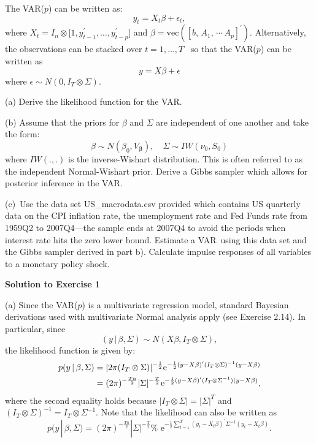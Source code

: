 \documentclass{article}
\begin{document}
The VAR($p$) can be written as: 
\begin{equation*}
y_{t}=X_{t}\beta +\epsilon _{t},
\end{equation*}%
where $X_{t}=I_{n}\otimes \lbrack 1,y_{t-1}^{\prime },\ldots
,y_{t-p}^{\prime }]$ and $\beta =\text{vec}([b,\,A_{1},\,\cdots
\,A_{p}]^{\prime }).$ Alternatively, the observations can be stacked over $%
t=1,\ldots ,T$ \ so that the VAR($p$) can be written as 
\begin{equation*}
y=X\beta +\epsilon
\end{equation*}%
where $\epsilon \sim N(0,I_{T}\otimes \Sigma )$.

(a) Derive the likelihood function for the VAR.

(b) Assume that the priors for $\beta $ and $\Sigma $ are independent of one
another and take the form: 
\begin{equation}
\beta \sim N(\beta _{0},V_{\boldsymbol{\beta }}),\quad \Sigma \sim IW(\nu
_{0},S_{0})  \label{VAR-prior}
\end{equation}%
where $IW(.,.)$ is the inverse-Wishart distribution. This is often referred
to as the independent Normal-Wishart prior. Derive a Gibbs sampler which
allows for posterior inference in the VAR.

(c)\ Use the data set US\_macrodata.csv provided which contains US quarterly
data on the CPI inflation rate, the unemployment rate and Fed Funds rate
from 1959Q2 to 2007Q4---the sample ends at 2007Q4 to avoid the periods when
interest rate hits the zero lower bound. Estimate a VAR\ using this data set
and the Gibbs sampler derived in part b). Calculate impulse responses of all
variables to a monetary policy shock.

\textbf{Solution to Exercise 1}

(a) Since the VAR($p$) is a multivariate regression model, standard Bayesian
derivations used with multivariate Normal analysis apply (see Exercise
2.14). In particular, since 
\begin{equation*}
(y\,|\,\beta ,\Sigma )\sim N(X\beta ,I_{T}\otimes \Sigma ),
\end{equation*}%
the likelihood function is given by: 
\begin{align}
p(y\,|\,\beta ,\Sigma )& =|2\pi (I_{T}\otimes \Sigma )|^{-\frac{1}{2}}\text{e%
}^{-\frac{1}{2}(y-X\beta )^{\prime }(I_{T}\otimes \Sigma )^{-1}(y-X\beta )} 
\notag \\
& =(2\pi )^{-\frac{Tn}{2}}|\Sigma |^{-\frac{T}{2}}\text{e}^{-\frac{1}{2}%
(y-X\beta )^{\prime }(I_{T}\otimes \Sigma ^{-1})(y-X\beta )},
\label{VAR-like1}
\end{align}%
where the second equality holds because $|I_{T}\otimes \Sigma |=|\Sigma
|^{T} $ and $(I_{T}\otimes \Sigma )^{-1}=I_{T}\otimes \Sigma ^{-1}$. Note
that the likelihood can also be written as 
\begin{equation}
p(y\,|\,\beta ,\Sigma )=(2\pi )^{-\frac{Tn}{2}}|\Sigma |^{-\frac{T}{2}}\text{%
e}^{-\frac{1}{2}\sum_{t=1}^{T}(y_{t}-X_{t}\beta )^{\prime }\Sigma
^{-1}(y_{t}-X_{t}\beta )}.  \label{VAR-like2}
\end{equation}
\end{document}
